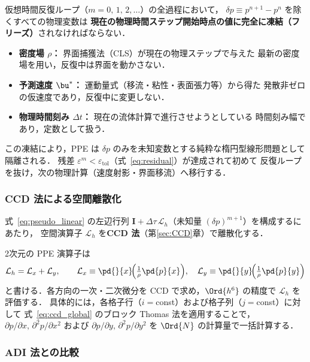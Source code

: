 仮想時間反復ループ（$m = 0,\,1,\,2,\ldots$）の全過程において，
$\delta p \equiv p^{n+1}-p^n$ を除くすべての物理変数は
\textbf{現在の物理時間ステップ開始時点の値に完全に凍結（フリーズ）}されなければならない．
\begin{itemize}
  \item \textbf{密度場 $\rho$：} 界面捕獲法（CLS）が現在の物理ステップで与えた
        最新の密度場を用い，反復中は界面を動かさない．
  \item \textbf{予測速度 $\bu^*$：} 運動量式（移流・粘性・表面張力等）から得た
        発散非ゼロの仮速度であり，反復中に変更しない．
  \item \textbf{物理時間刻み $\Delta t$：} 現在の流体計算で進行させようとしている
        時間刻み幅であり，定数として扱う．
\end{itemize}
この凍結により，PPE は $\delta p$ のみを未知変数とする純粋な楕円型線形問題として隔離される．
残差 $\varepsilon^m < \varepsilon_\mathrm{tol}$（式~\eqref{eq:residual}）が達成されて初めて
反復ループを抜け，次の物理計算（速度射影・界面移流）へ移行する．

\subsubsection{CCD 法による空間離散化}
\label{sec:pseudo_ccd_discretization}

式~\eqref{eq:pseudo_linear} の左辺行列 $\mathbf{I} + \Delta\tau\,\mathcal{L}_h$（未知量 $(\delta p)^{m+1}$）を構成するにあたり，
空間演算子 $\mathcal{L}_h$ を\textbf{CCD 法}（第\ref{sec:CCD}章）で離散化する．

2次元の PPE 演算子は
\begin{equation}
  \mathcal{L}_h = \mathcal{L}_x + \mathcal{L}_y,
  \qquad
  \mathcal{L}_x \equiv \pd{}{x}\!\Bigl(\tfrac{1}{\rho}\pd{p}{x}\Bigr),\quad
  \mathcal{L}_y \equiv \pd{}{y}\!\Bigl(\tfrac{1}{\rho}\pd{p}{y}\Bigr)
  \label{eq:L_split}
\end{equation}
と書ける．各方向の一次・二次微分を CCD で求め，$\Ord{h^6}$ の精度で $\mathcal{L}_h$ を評価する．
具体的には，各格子行（$i=$const）および格子列（$j=$const）に対して
式~\eqref{eq:ccd_global} のブロック Thomas 法を適用することで，
$\partial p/\partial x,\,\partial^2 p/\partial x^2$ および $\partial p/\partial y,\,\partial^2 p/\partial y^2$ を
$\Ord{N}$ の計算量で一括計算する．

\subsubsection{ADI 法との比較}
\label{sec:pseudo_adi_comparison}

